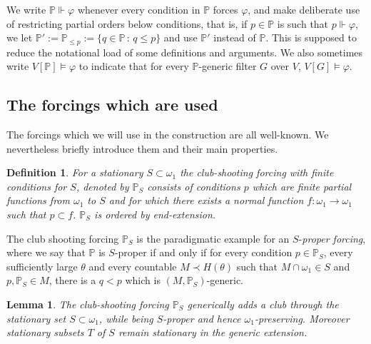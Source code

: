 \documentclass[a4paper,11pt]{article}
\newtheorem{lemma}[theorem]{Lemma}
\newtheorem{definition}[theorem]{Definition}
\newcommand{\forceP}{\mathbb{P}}
\begin{document}
We write $\forceP \Vdash \varphi$ whenever every condition in $\forceP$ forces $\varphi$, and make deliberate use of restricting partial orders below conditions, that is, if $p \in \forceP $ is such that $p \Vdash \varphi$, we let $\forceP':= \forceP_{\le p}:=\{ q \in \forceP \, : \, q \le p\}$ and use $\forceP'$ instead of $\forceP$. This is supposed to reduce the notational load of some definitions and arguments.
We also sometimes write $V[\forceP]\models \varphi$ to indicate that for every $\forceP$-generic filter $G$ over $V$, $V[G] \models \varphi$.

\subsection{The forcings which are used}
The forcings which we will use in the construction are all well-known. We nevertheless briefly introduce them and their main properties. 

\begin{definition}
 For a stationary $S \subset \omega_1$ the club-shooting forcing with finite conditions for $S$, denoted by $\forceP_S$ consists
 of conditions $p$ which are finite partial functions from $\omega_1$ to $S$ and for which there exists a normal function $f: \omega_1 \rightarrow \omega_1$ such that $p \subset f$. $\forceP_S$ is ordered by end-extension.
 \end{definition}
The club shooting forcing $\forceP_S$ is the paradigmatic example for an $S$-\emph{proper forcing}, where we say that $\forceP$ is $S$-proper if and only if for every condition $p \in \forceP_S$, every sufficiently large $\theta$ and every countable $M \prec H(\theta)$ such that $M \cap \omega_1 \in S$ and $p, \forceP_S \in M$, there is a $q<p$ which is $(M, \forceP_S)$-generic. 
\begin{lemma}
 The club-shooting forcing $\forceP_S$ generically adds a club through the stationary set $S \subset \omega_1$, while being $S$-proper and
 hence $\omega_1$-preserving. Moreover stationary subsets $T$ of $S$ remain stationary in the generic extension. 
\end{lemma}
\end{document}
